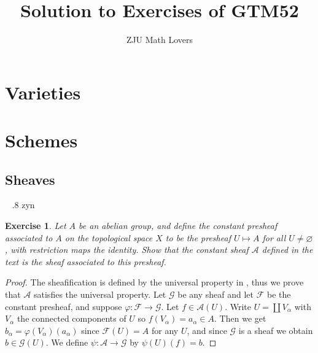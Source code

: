 \documentclass{amsart}
\title{Solution to Exercises of GTM52}
\date{}
\author{ZJU Math Lovers}
\newtheorem{exe}{Exercise}[subsection]
\begin{document}
\maketitle
\tableofcontents
\section{Varieties}
\section{Schemes}

\subsection{Sheaves}
\ \newline
{}.8 zyn
\begin{exe}
Let $A$ be an abelian group, and define the constant presheaf associated to $A$ on the topological space $X$ to be the presheaf $U \mapsto A$ for all $U \neq \varnothing$, with restriction maps the identity. Show that the constant sheaf $\mathscr{A}$ defined in the text is the sheaf associated to this presheaf.
\end{exe}  
\begin{proof}
The sheafification is defined by the universal property in \cite{HAR},  thus we prove that $\mathscr{A}$ satisfies the universal property.  Let $\mathscr{G}$ be any sheaf and let $\mathscr{F}$ be the constant presheaf, and suppose $\varphi: \mathscr{F} \rightarrow \mathscr{G}$.  Let $f \in \mathscr{A}(U)$.  Write $U=\coprod V_{\alpha}$ with $V_{\alpha}$ the connected components of $U$ so $f(V_{\alpha})=a_{\alpha} \in A .$ Then we get $b_{\alpha}=\varphi(V_{\alpha})(a_{\alpha})$ since $\mathscr{F}(U)=A$ for any $U$,  and since $\mathscr{G}$ is a sheaf we obtain $b \in \mathscr{G}(U)$.  We define $\psi: \mathscr{A} \rightarrow \mathscr{G}$ by $\psi(U)(f)=b$.
\end{proof}
\end{document}
